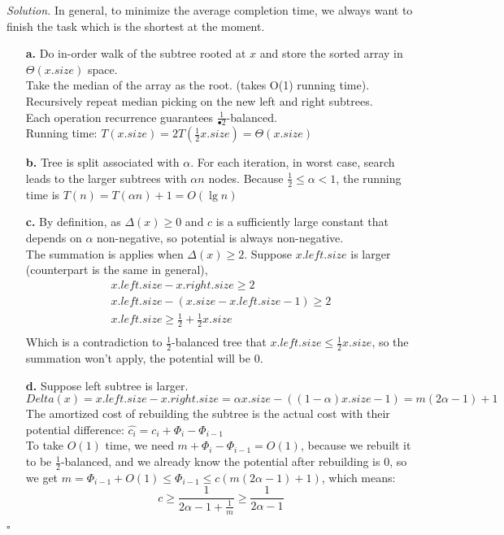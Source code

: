 \documentclass[11pt]{article}
\theoremstyle{definition}
\newenvironment{solution}{\noindent\emph{Solution.}}{\hfill$\square$}
\newcommand\tab[1][1cm]{\hspace*{#1}}
\begin{document}
\begin{solution}
In general, to minimize the average completion time, we always want to finish the task which is the shortest at the moment.

\begin{enumerate}
  \item[\textbf{a.}]Do in-order walk of the subtree rooted at $x$ and store the sorted array in $\Theta(x.size)$ space.\\
 \tab Take the median of the array as the root. (takes O(1) running time).\\
 \tab Recursively repeat median picking on the new left and right subtrees.\\
 \tab Each operation recurrence guarantees $\frac{1}{•2}$-balanced.\\
 \tab Running time: $T(x.size) = 2T(\frac{1}{2}x.size) = \Theta(x.size)$\\

  \item[\textbf{b.}]
Tree is split associated with $\alpha$. For each iteration, in worst case, search leads to the larger subtrees with $\alpha n $ nodes. Because $\frac{1}{2} \leq  \alpha < 1$, the running time is $T(n) = T(\alpha n) + 1 = O(\lg n)$

  \item[\textbf{c.}]
  By definition, as $\Delta(x) \geq 0$ and $c$ is a sufficiently large constant that depends on $\alpha$ non-negative, so potential is always non-negative.\\ 
  \tab The summation is applies when $\Delta(x) \geq 2$. Suppose $x.left.size$ is larger (counterpart is the same in general),  
  \begin{align*}
  x.left.size - x.right.size \geq 2\\
  x.left.size - (x.size - x.left.size-1) \geq 2\\
  x.left.size \geq \frac{1}{2} + \frac{1}{2}x.size\\
    \end{align*}
  Which is a contradiction to $\frac{1}{2}$-balanced tree that $x.left.size \leq \frac{1}{2}x.size$, so the summation won't apply, the potential will be $0$.


 \item[\textbf{d.}] Suppose left subtree is larger.\\
 $Delta(x) =  x.left.size - x.right.size = \alpha x.size- ((1-\alpha)x.size-1) = m(2\alpha -1)+1$\\
 \tab The amortized cost of rebuilding the subtree is the actual cost
with their potential difference: $\widehat{c_i} = c_i + \Phi_i - \Phi_{i-1}$\\
 \tab To take $O(1)$ time, we need $m +  \Phi_i - \Phi_{i-1} = O(1)$, because we rebuilt it to be $\frac{1}{2}$-balanced, and we already know the potential after rebuilding is $0$, so we get $m =  \Phi_{i-1} + O(1) \leq  \Phi_{i-1} \leq c(m(2\alpha -1)+1)$, which means:
 $$c \geq \frac{1}{2\alpha -1 + \frac{1}{m}} \geq \frac{1}{2\alpha - 1}$$
 

\end{enumerate}
\end{solution}
\end{document}
